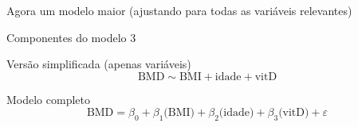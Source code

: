\documentclass{beamer}
\begin{document}

\begin{frame}{\scriptsize }
  \begin{center}
    Agora um modelo maior (ajustando para todas as variáveis relevantes)
  \end{center}
\end{frame}

\begin{frame}{\scriptsize Componentes do modelo 3}
  \begin{block}{\footnotesize Versão simplificada (apenas variáveis)}
    \footnotesize
    \begin{displaymath}
      \text{BMD} \sim \text{BMI} + \text{idade} + \text{vitD}
    \end{displaymath}
  \end{block}
  \bigskip
  \bigskip
  \begin{block}{Modelo completo}
    \footnotesize
    \begin{displaymath}
      \text{BMD} =\beta_0 + \beta_1 \text{(BMI)} + \beta_2 \text{(idade)} + \beta_3 \text{(vitD)} +\varepsilon
    \end{displaymath}
  \end{block}
  \vfill
\end{frame}
\end{document}
